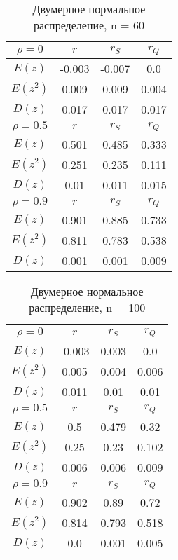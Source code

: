 \documentclass{article}
\begin{document}
	
	\begin{table}[H]
		\centering
		\begin{tabular}{| c | c | c | c |}
			
			\hline
			$\rho = 0$ & $r$      & $r_S$  & $r_Q$ \\
			\hline
			$E(z)$   & -0.003 & -0.007 & 0.0   \\
            $E(z^{2})$ & 0.009  & 0.009  & 0.004 \\
            $D(z)$  & 0.017  & 0.017  & 0.017 \\
			\hline
			$\rho = 0.5$ & $r$      & $r_S$  & $r_Q$ \\
			\hline
			$E(z)$      & 0.501 & 0.485 & 0.333 \\
            $E(z^{2})$   & 0.251 & 0.235 & 0.111 \\
            $D(z)$        & 0.01  & 0.011 & 0.015 \\    
			\hline
			$\rho = 0.9$ & $r$      & $r_S$  & $r_Q$ \\
			\hline
			$E(z)$     & 0.901 & 0.885 & 0.733 \\
            $E(z^{2})$  & 0.811 & 0.783 & 0.538 \\
            $D(z)$     & 0.001 & 0.001 & 0.009 \\
			\hline
			
		\end{tabular}{}
		\caption{Двумерное нормальное распределение, n = 60}
		\label{tab:n60}
	\end{table}
	
	
	
	\begin{table}[H]
		\centering
		\begin{tabular}{| c | c | c | c |}
			
			\hline
			$\rho = 0$ & $r$      & $r_S$  & $r_Q$ \\
			\hline
			$E(z)$  & -0.003 & 0.003 & 0.0   \\
            $E(z^{2})$ & 0.005  & 0.004 & 0.006 \\
            $D(z)$    & 0.011  & 0.01  & 0.01  \\
			\hline
			$\rho = 0.5$ & $r$      & $r_S$  & $r_Q$ \\
			\hline
			$E(z)$      & 0.5   & 0.479 & 0.32  \\
            $E(z^{2})$      & 0.25  & 0.23  & 0.102 \\
            $D(z)$    & 0.006 & 0.006 & 0.009 \\
			\hline
			$\rho = 0.9$ & $r$      & $r_S$  & $r_Q$ \\
			\hline
			$E(z)$       & 0.902 & 0.89  & 0.72  \\
            $E(z^{2})$    & 0.814 & 0.793 & 0.518 \\
            $D(z)$      & 0.0   & 0.001 & 0.005 \\
			\hline
			
		\end{tabular}{}
		\caption{Двумерное нормальное распределение, n = 100}
		\label{tab:n100}
	\end{table}
	
\end{document}
